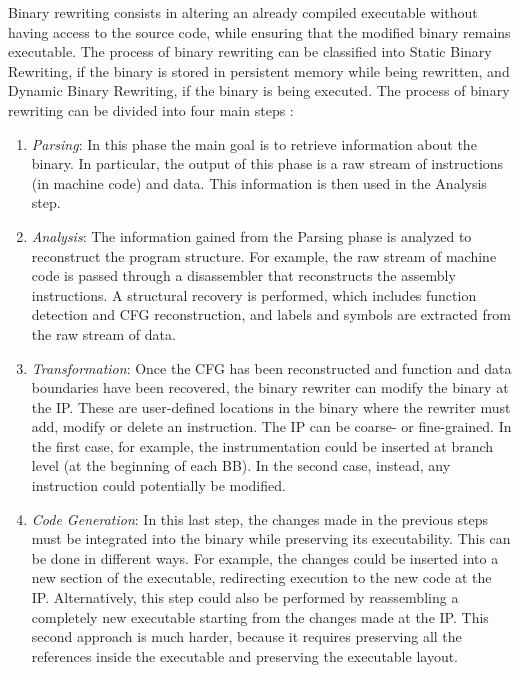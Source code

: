 Binary rewriting consists in altering an already compiled executable without having access to the source code,
        while ensuring that the modified binary remains executable.
        The process of binary rewriting can be classified into Static Binary Rewriting, if the binary is stored in
        persistent memory while being rewritten, and Dynamic Binary Rewriting, if the binary is being executed.
        The process of binary rewriting can be divided into four main steps \cite{binaryrewriting}:
        \begin{enumerate}
            \item \textit{Parsing}: In this phase the main goal is to retrieve information about the binary.
                In particular, the output of this phase is a raw stream of instructions (in machine code) and data.
                This information is then used in the Analysis step.

            \item \textit{Analysis}: The information gained from the Parsing phase is analyzed to reconstruct the program structure.
            For example, the raw stream of machine code is passed through a disassembler that reconstructs the
            assembly instructions. A structural recovery is performed, which includes function detection and \gls{CFG} reconstruction,
            and labels and symbols are extracted from the raw stream of data.

            \item \textit{Transformation}: Once the \gls{CFG} has been reconstructed and function and data boundaries have been recovered,
                the binary rewriter can modify the binary at the \gls{IP}. These are user-defined locations in the binary where
                the rewriter must add, modify or delete an instruction. The \gls{IP} can be coarse- or fine-grained.
                In the first case, for example, the instrumentation could be inserted at branch level (at the beginning of each \gls{BB}).
                In the second case, instead, any instruction could potentially be modified.

            \item \textit{Code Generation}: In this last step, the changes made in the previous steps must be integrated into the
                binary while preserving its executability. This can be done in different ways. For example, the changes could be
                inserted into a new section of the executable, redirecting execution to the new code at the \gls{IP}.
                Alternatively, this step could also be performed by reassembling a completely new executable starting from the
                changes made at the \gls{IP}. This second approach is much harder, because it requires preserving all the
                references inside the executable and preserving the executable layout.
        \end{enumerate}
